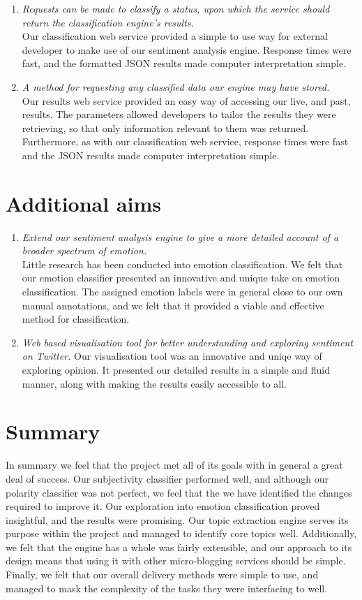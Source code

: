 \begin{enumerate}
	\item \emph{Requests can be made to classify a status, upon which the service should return the classification engine's results.} \\
	Our classification web service provided a simple to use way for external developer to make use of our sentiment analysis engine. Response times were fast, and the formatted JSON results made computer interpretation simple.
	\item \emph{A method for requesting any classified data our engine may have stored.} \\
	Our results web service provided an easy way of accessing our live, and past, results. The parameters allowed developers to tailor the results they were retrieving, so that only information relevant to them was returned. Furthermore, as with our classification web service, response times were fast and the JSON results made computer interpretation simple.
\end{enumerate}
	
\section{Additional aims}

\begin{enumerate}
	\item \emph{Extend our sentiment analysis engine to give a more detailed account of a broader spectrum of emotion.} \\
	Little research has been conducted into emotion classification. We felt that our emotion classifier presented an innovative and unique take on emotion classification. The assigned emotion labels were in general close to our own manual annotations, and we felt that it provided a viable and effective method for classification.
	\item \emph{Web based visualisation tool for better understanding and exploring sentiment on Twitter.}
	Our visualisation tool was an innovative and uniqe way of exploring opinion. It presented our detailed results in a simple and fluid manner, along with making the results easily accessible to all.
\end{enumerate}

\section{Summary}

In summary we feel that the project met all of its goals with in general a great deal of success. Our subjectivity classifier performed well, and although our polarity classifier was not perfect, we feel that the we have identified the changes required to improve it. Our exploration into emotion classification proved insightful, and the results were promising. Our topic extraction engine serves its purpose within the project and managed to identify core topics well. Additionally, we felt that the engine has a whole was fairly extensible, and our approach to its design means that using it with other micro-blogging services should be simple. Finally, we felt that our overall delivery methods were simple to use, and managed to mask the complexity of the tasks they were interfacing to well.
